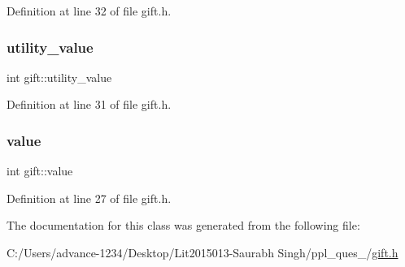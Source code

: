 Definition at line 32 of file gift.\+h.

\mbox{\label{classgift_a4b2ef48d28d424249c482ed19832b92c}} 
\subsubsection{\texorpdfstring{utility\+\_\+value}{utility\_value}}
{\footnotesize\ttfamily int gift\+::utility\+\_\+value}



Definition at line 31 of file gift.\+h.

\mbox{\label{classgift_aa9e6fcf5bc68d7f151e7a853a25dcbeb}} 
\subsubsection{\texorpdfstring{value}{value}}
{\footnotesize\ttfamily int gift\+::value}



Definition at line 27 of file gift.\+h.



The documentation for this class was generated from the following file\+:\begin{DoxyCompactItemize}
\item 
C\+:/\+Users/advance-\/1234/\+Desktop/\+Lit2015013-\/\+Saurabh Singh/ppl\+\_\+ques\+\_/\hyperlink{gift_8h}{gift.\+h}\end{DoxyCompactItemize}
